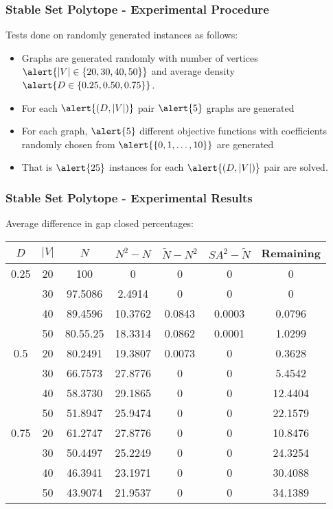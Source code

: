 \documentclass{beamer}
\begin{document}
\begin{frame}
\frametitle{Stable Set Polytope - Experimental Procedure}
Tests done on randomly generated instances as follows:
\begin{itemize}
\item Graphs are generated randomly with number of vertices $\alert{|V| \in \{20,30,40,50\}}$ and average density $\alert{D \in \{0.25,0.50,0.75\}}$. 
\item For each $\alert{(D,|V|)}$ pair $\alert{5}$ graphs are generated
\item For each graph, $\alert{5}$ different objective functions with coefficients randomly chosen from $\alert{\{0,1,\dots,10\}}$ are generated
\item That is $\alert{25}$ instances for each $\alert{(D,|V|)}$ pair are solved.
\end{itemize}
\end{frame}

\begin{frame}
\frametitle{Stable Set Polytope - Experimental Results}
\centering
Average difference in gap closed percentages:

\begin{tabular}{c c | c c c c c}
\hline
\rule{0pt}{4ex}$D$ &$|V|$ & $N$ & $N^2 - N$ & $\tilde{N} - N^2$ & $SA^2 - \tilde{N}$ & Remaining \\ \hline
0.25 & 20 & 100 & 0 & 0 & 0 & 0 \\ 
 & 30 & 97.5086 & 2.4914 & 0 & 0 & 0 \\ 
& 40 & 89.4596 & \alert{10.3762} & \alert{0.0843} & \alert{0.0003 }& 0.0796 \\ 
& 50 & 80.55.25 & \alert{18.3314} & \alert{0.0862} & \alert{0.0001} & 1.0299 \\ \hline
0.5 & 20 & 80.2491 & 19.3807 & 0.0073 & 0 & 0.3628 \\
& 30 & 66.7573 & 27.8776 & 0 & 0 & 5.4542 \\
& 40 & 58.3730 & 29.1865 & 0 & 0 & 12.4404 \\
& 50 & 51.8947 & 25.9474 & 0 & 0 & 22.1579 \\ \hline
0.75 & 20 & 61.2747 & 27.8776 & 0 & 0 & 10.8476 \\
& 30 & 50.4497 & 25.2249 & 0 & 0 & 24.3254 \\
& 40 & 46.3941 & 23.1971 & 0 & 0 & 30.4088 \\
& 50 & 43.9074 & 21.9537 & 0 & 0 & 34.1389 \\ \hline
\end{tabular}
\end{frame}
\end{document}
